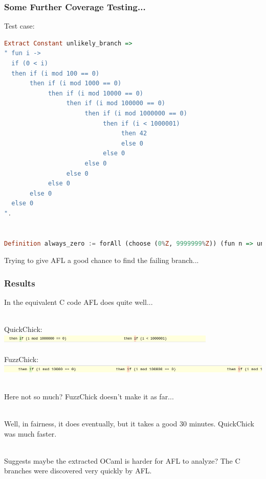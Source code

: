\documentclass{beamer}
\begin{document}
\begin{frame}[fragile]
  \frametitle{Some Further Coverage Testing...}

  Test case:

\begin{lstlisting}[language=Haskell]
Extract Constant unlikely_branch =>
" fun i ->
  if (0 < i)
  then if (i mod 100 == 0)
       then if (i mod 1000 == 0)
            then if (i mod 10000 == 0)
                 then if (i mod 100000 == 0)
                      then if (i mod 1000000 == 0)
                           then if (i < 1000001)
                                then 42
                                else 0
                           else 0
                      else 0
                 else 0
            else 0
       else 0
  else 0
".


Definition always_zero := forAll (choose (0%Z, 9999999%Z)) (fun n => unlikely_branch n =? 0).
\end{lstlisting}

  \pause

  {\large Trying to give AFL a good chance to find the failing branch...}

\end{frame}

\begin{frame}
  \frametitle{Results}

  In the equivalent C code AFL does quite well... \\~\\

  \pause

  QuickChick: \\

  \includegraphics[width=\textwidth]{qc_branches.png} \\~\\

  FuzzChick: \\

  \includegraphics[width=\textwidth]{fuzz_branches.png} \\~\\

  \pause
  
  Here not so much? FuzzChick doesn't make it as far... \\~\\

  \pause

  Well, in fairness, it does eventually, but it takes a good 30
  minutes. QuickChick was much faster. \\~\\

  \pause

  Suggests maybe the extracted OCaml is harder for AFL to analyze? The
  C branches were discovered very quickly by AFL.
  
\end{frame}
\end{document}
